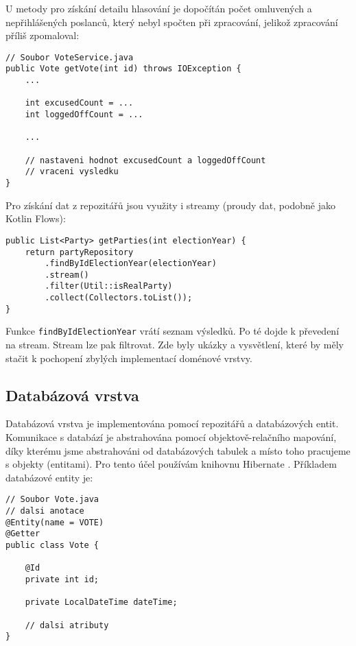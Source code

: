 \noindent U metody pro získání detailu hlasování je dopočítán počet omluvených a nepřihlášených poslanců, který nebyl spočten při zpracování, jelikož zpracování příliš zpomaloval:

\begin{lstlisting}[caption={Ukázka dopočtu statistik pro detail hlasování za běhu v doménové vrstvě}, label={lst:excused-count}, tabsize=2]
// Soubor VoteService.java
public Vote getVote(int id) throws IOException {
	...
	
	int excusedCount = ... 	
	int loggedOffCount = ...
	
	...
	
	// nastaveni hodnot excusedCount a loggedOffCount
	// vraceni vysledku
}
\end{lstlisting}

\noindent Pro získání dat z repozitářů jsou využity i streamy (proudy dat, podobně jako Kotlin Flows):

\begin{lstlisting}[caption={Ukázka použití streamu}, tabsize=2]
public List<Party> getParties(int electionYear) {
	return partyRepository
		.findByIdElectionYear(electionYear)
		.stream()
		.filter(Util::isRealParty)
		.collect(Collectors.toList());
}
\end{lstlisting}

\noindent Funkce \lstinline|findByIdElectionYear| vrátí seznam výsledků. Po té dojde k převedení na stream. Stream lze pak filtrovat. Zde byly ukázky a vysvětlení, které by měly stačit k pochopení zbylých implementací doménové vrstvy.

\subsection {Databázová vrstva}
Databázová vrstva je implementována pomocí repozitářů a databázových entit. Komunikace s databází je abstrahována pomocí objektově-relačního mapování, díky kterému jsme abstrahováni od databázových tabulek a místo toho pracujeme s objekty (entitami). Pro tento účel používám knihovnu Hibernate \cite{hibernate}. Příkladem databázové entity je:

\begin{lstlisting}[caption={Entita Vote reprezentující hlasování}, label={lst:vote-entity}, tabsize=2]
// Soubor Vote.java
// dalsi anotace
@Entity(name = VOTE)
@Getter
public class Vote {
	
	@Id
	private int id;
	
	private LocalDateTime dateTime;
	
	// dalsi atributy
}
	
\end{lstlisting}

